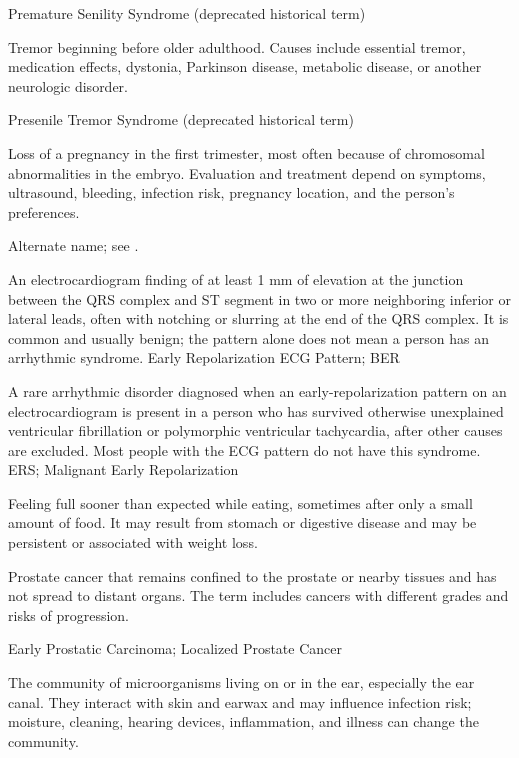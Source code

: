\synonyms
Premature Senility Syndrome (deprecated historical term)

 Tremor beginning before older adulthood. Causes include essential tremor, medication effects, dystonia, Parkinson disease, metabolic disease, or another neurologic disorder.

\synonyms
Presenile Tremor Syndrome (deprecated historical term)

 Loss of a pregnancy in the first trimester, most often because of chromosomal abnormalities in the embryo. Evaluation and treatment depend on symptoms, ultrasound, bleeding, infection risk, pregnancy location, and the person’s preferences.

 Alternate name; see .

 An electrocardiogram finding of at least 1 mm of elevation at the junction between the QRS complex and ST segment in two or more neighboring inferior or lateral leads, often with notching or slurring at the end of the QRS complex. It is common and usually benign; the pattern alone does not mean a person has an arrhythmic syndrome.
\synonyms
Early Repolarization ECG Pattern; BER

 A rare arrhythmic disorder diagnosed when an early-repolarization pattern on an electrocardiogram is present in a person who has survived otherwise unexplained ventricular fibrillation or polymorphic ventricular tachycardia, after other causes are excluded. Most people with the ECG pattern do not have this syndrome.
\synonyms
ERS; Malignant Early Repolarization

 Feeling full sooner than expected while eating, sometimes after only a small amount of food. It may result from stomach or digestive disease and may be persistent or associated with weight loss.

 Prostate cancer that remains confined to the prostate or nearby tissues and has not spread to distant organs. The term includes cancers with different grades and risks of progression.

\synonyms
Early Prostatic Carcinoma; Localized Prostate Cancer

 The community of microorganisms living on or in the ear, especially the ear canal. They interact with skin and earwax and may influence infection risk; moisture, cleaning, hearing devices, inflammation, and illness can change the community.

